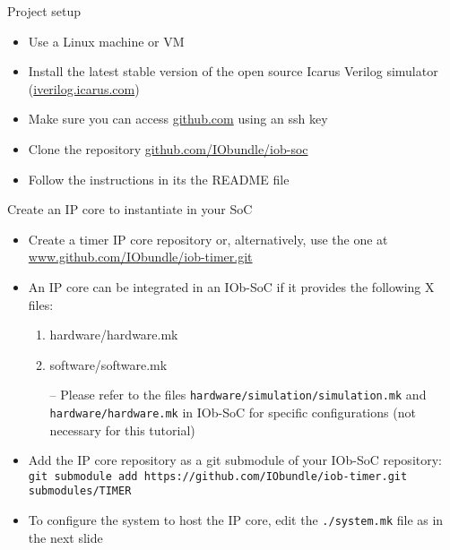\documentclass [xcolor=svgnames, t] {beamer}
\begin{document}
\begin{frame}{Project setup}
\begin{center}
  \begin{itemize}
    \item Use a Linux machine or VM
    \item Install the latest stable version of the open source Icarus Verilog simulator (\url{iverilog.icarus.com})
    \item Make sure you can access \url{github.com} using an ssh key
    \item Clone the repository \url{github.com/IObundle/iob-soc}
    \item Follow the instructions in its the README file
  \end{itemize}
\end{center}
\end{frame}


\begin{frame}{Create an IP core to instantiate in your SoC}
  \begin{itemize}
  \item Create a timer IP core repository or, alternatively, use the one at \url{www.github.com/IObundle/iob-timer.git}
  \item An IP core can be integrated in an IOb-SoC if it provides the following X files: 
    \begin{enumerate}
    \item hardware/hardware.mk
    \item software/software.mk
    \end{enumerate}
    \begin{itemize}
      \item[--] Please refer to the files {\tt hardware/simulation/simulation.mk} and {\tt hardware/hardware.mk} in IOb-SoC for specific configurations (not necessary for this tutorial)
    \end{itemize}
  \item Add the IP core repository as a git submodule of your IOb-SoC repository:\\
    {\tiny \tt git submodule add https://github.com/IObundle/iob-timer.git submodules/TIMER}
  \item To configure the system to host the IP core, edit the {\tt ./system.mk} file as in the next slide
  \end{itemize}
\end{frame}

\lstset{basicstyle=\ttfamily,columns=fullflexible}
\end{document}
